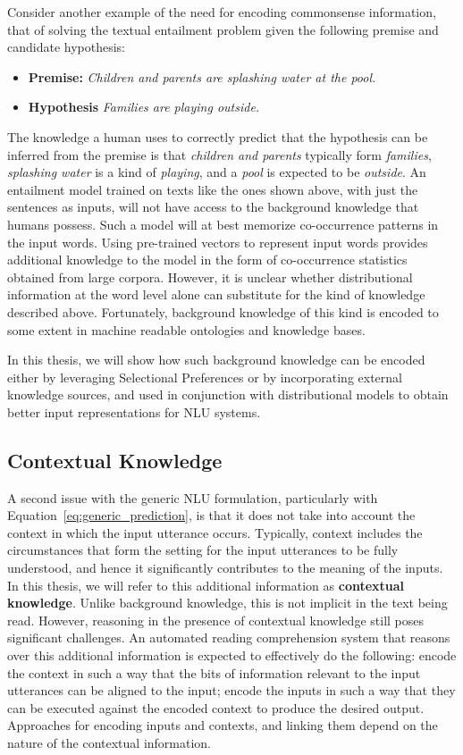 Consider another example of the need for encoding commonsense information, that of solving the 
textual entailment problem given the following premise and candidate hypothesis:
\begin{itemize}
 \item[] \textbf{Premise:} \textit{Children and parents are splashing water at the pool.}
 \item[] \textbf{Hypothesis} \textit{Families are playing outside.}
\end{itemize}
The knowledge a human uses to correctly predict that the hypothesis can be inferred from the 
premise is that \textit{children and parents} typically form \textit{families}, \textit{splashing water} 
is a kind of \textit{playing}, and a \textit{pool} is expected to be \textit{outside}. An entailment model trained on texts like the
ones shown above, with just the sentences as inputs, will not have access to the background knowledge that humans possess.
Such a model will at best memorize co-occurrence patterns in the input words. Using pre-trained vectors to represent input words provides additional
knowledge to the model in the form of co-occurrence statistics obtained from large corpora. However, it is unclear whether distributional
information at the word level alone can substitute for the kind of knowledge described above.
Fortunately, background knowledge of this kind is encoded to some extent in machine readable
ontologies and knowledge bases.

In this thesis, we will show how such background knowledge can be encoded either by leveraging Selectional Preferences
or by incorporating external knowledge sources, and used in conjunction with distributional models to obtain better input representations
for NLU systems.

\subsection{Contextual Knowledge}
A second issue with the generic NLU formulation, particularly with Equation~\ref{eq:generic_prediction}, is that it does not take into account the context
in which the input utterance occurs. Typically, context includes the circumstances that form the setting for the input utterances to be fully understood,
and hence it significantly contributes to the meaning of the inputs.
In this thesis, we will refer to this additional information as \textbf{contextual knowledge}.
Unlike background knowledge, this is not implicit in the
text being read. However, reasoning in the presence of contextual knowledge still poses significant challenges. An automated reading comprehension system that
reasons over this additional information is expected to effectively do the following: encode the context in such a way that the bits of information relevant to the input
utterances can be aligned to the input; encode the inputs in such a way that they can be executed against the encoded context to produce the desired output. Approaches
for encoding inputs and contexts, and linking them depend on the nature of the contextual information.

